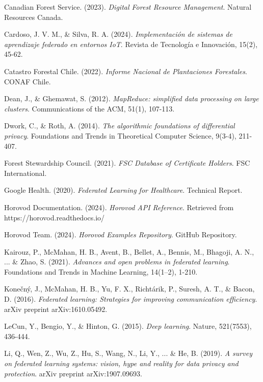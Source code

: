 \begin{thebibliography}{99}
	Canadian Forest Service. (2023).
	\textit{Digital Forest Resource Management}.
	Natural Resources Canada.
	
	Cardoso, J. V. M., \& Silva, R. A. (2024).
	\textit{Implementación de sistemas de aprendizaje federado en entornos IoT}.
	Revista de Tecnología e Innovación, 15(2), 45-62.
	
	Catastro Forestal Chile. (2022).
	\textit{Informe Nacional de Plantaciones Forestales}.
	CONAF Chile.
	
	Dean, J., \& Ghemawat, S. (2012).
	\textit{MapReduce: simplified data processing on large clusters}.
	Communications of the ACM, 51(1), 107-113.
	
	Dwork, C., \& Roth, A. (2014).
	\textit{The algorithmic foundations of differential privacy}.
	Foundations and Trends in Theoretical Computer Science, 9(3-4), 211-407.
	
	Forest Stewardship Council. (2021).
	\textit{FSC Database of Certificate Holders}.
	FSC International.
	
	Google Health. (2020).
	\textit{Federated Learning for Healthcare}.
	Technical Report.
	
	Horovod Documentation. (2024).
	\textit{Horovod API Reference}.
	Retrieved from https://horovod.readthedocs.io/
	
	Horovod Team. (2024).
	\textit{Horovod Examples Repository}.
	GitHub Repository.
	
	Kairouz, P., McMahan, H. B., Avent, B., Bellet, A., Bennis, M., Bhagoji, A. N., ... \& Zhao, S. (2021).
	\textit{Advances and open problems in federated learning}.
	Foundations and Trends in Machine Learning, 14(1–2), 1-210.
	
	Konečný, J., McMahan, H. B., Yu, F. X., Richtárik, P., Suresh, A. T., \& Bacon, D. (2016).
	\textit{Federated learning: Strategies for improving communication efficiency}.
	arXiv preprint arXiv:1610.05492.
	
	LeCun, Y., Bengio, Y., \& Hinton, G. (2015).
	\textit{Deep learning}.
	Nature, 521(7553), 436-444.
	
	Li, Q., Wen, Z., Wu, Z., Hu, S., Wang, N., Li, Y., ... \& He, B. (2019).
	\textit{A survey on federated learning systems: vision, hype and reality for data privacy and protection}.
	arXiv preprint arXiv:1907.09693.
	

\end{thebibliography}
